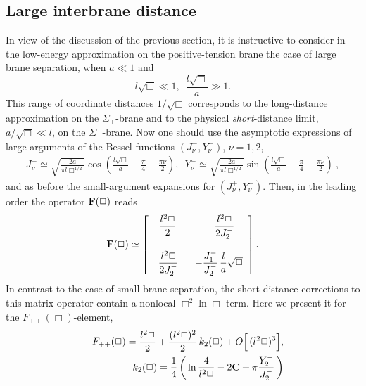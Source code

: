 \documentclass[a4paper,preprint,nofootinbib,
                 showpacs,preprintnumbers,amsmath,amssymb]{revtex4}
\begin{document}
\subsection{Large interbrane distance\label{large}} 
In view of the discussion of the previous section, it is instructive  
to consider in the low-energy approximation on the positive-tension brane 
the case of large brane separation, when $a\ll 1$ and 
    \begin{equation} 
    l\sqrt\Box\ll 1,\,\,\, \frac{l\sqrt\Box}a\gg 1. \label{7.4.1} 
    \end{equation} 
This range of coordinate distances $1/\sqrt\Box$ corresponds to the  
long-distance approximation on the $\Sigma_+$-brane and to the physical  
{\em short}-distance limit, $a/\sqrt\Box\ll l$, on the $\Sigma_-$-brane. 
Now one should use the asymptotic expressions of large arguments of 
the Bessel functions $(J^-_\nu,Y^-_\nu)$, $\nu=1,2$, 
    \begin{eqnarray} 
    J^-_\nu\simeq\sqrt{\frac{2a}{\pi l\Box^{1/2}}} 
    \cos\left(\frac{l\sqrt\Box}a-\frac\pi4- 
    \frac{\pi\nu}2\right),\,\,\, 
    Y^-_\nu\simeq\sqrt{\frac{2a}{\pi l\Box^{1/2}}} 
    \sin\left(\frac{l\sqrt\Box}a-\frac\pi4- 
    \frac{\pi\nu}2\right)\ ,                      \label{7.4.2} 
    \end{eqnarray} 
and as before the small-argument expansions for $(J^+_\nu,Y^+_\nu)$. 
Then, in the leading order the operator ${\bf F}(\Box)$ reads 
    \begin{equation} 
    {\bf F}(\Box) \simeq 
    \left[\begin{array}{cr} 
    \,\,\displaystyle{l^2\Box\over2}\,\,  
    & \,\,\displaystyle{l^2\Box\over 2J_2^-}\,\,\,\,\, \\ 
    & \\ 
    \,\,\,\displaystyle{l^2\Box\over 2J_2^-}\,\, & 
    \,\, -\displaystyle{J_1^-\over J_2^-}\, 
    \frac{l}{a}\sqrt{\Box}\end{array}\right].      \label{7.4.3} 
    \end{equation} 
In contrast to the case of small brane separation, the 
short-distance corrections to this matrix operator contain 
a nonlocal $\Box^2\ln\Box$-term. Here we present it for the 
$F_{++}(\Box)$-element, 
    \begin{eqnarray} 
    &&F_{++}(\Box)=\frac{l^2\Box}2 
    +\frac{(l^2\Box)^2}2\,k_2(\Box) 
    +O\Big[\,(l^2\Box)^3\Big],                   \label{7.4.4}\\ 
    &&k_2(\Box)=\frac14\left(\,\ln\frac4{l^2\Box} 
    -2{\bf C}+ 
    \pi\frac{Y_2^-}{J_2^-}\,\right)          \label{7.4.5} 
    \end{eqnarray} 
\end{document}
